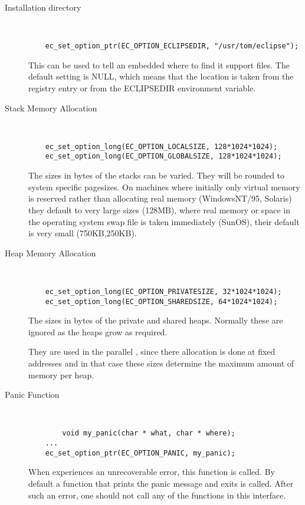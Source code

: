 \begin{description}
\item[Installation directory]\ \\
\begin{verbatim}
	ec_set_option_ptr(EC_OPTION_ECLIPSEDIR, "/usr/tom/eclipse");
\end{verbatim}
This can be used to tell an embedded {\eclipse} where to find it support files.
The default setting is NULL, which means that the location is
taken from the registry entry or from the ECLIPSEDIR environment variable.


\item[Stack Memory Allocation]\ \\
\begin{verbatim}
	ec_set_option_long(EC_OPTION_LOCALSIZE, 128*1024*1024);
	ec_set_option_long(EC_OPTION_GLOBALSIZE, 128*1024*1024);
\end{verbatim}
The sizes in bytes of the stacks can be varied. They will be rounded to
system specific pagesizes. On machines where initially only virtual memory
is reserved rather than allocating real memory (WindowsNT/95, Solaris) they
default to very large sizes (128MB), where real memory or space in the
operating system swap file is taken immediately (SunOS), their default
is very small (750KB,250KB).


\item[Heap Memory Allocation]\ \\
\begin{verbatim}
	ec_set_option_long(EC_OPTION_PRIVATESIZE, 32*1024*1024);
	ec_set_option_long(EC_OPTION_SHAREDSIZE, 64*1024*1024);
\end{verbatim}
The sizes in bytes of the private and shared heaps. Normally these are
ignored as the heaps grow as required.

They are used in the parallel {\eclipse}, since there allocation is done
at fixed addresses and in that case these sizes  determine the maximum
amount of memory per heap.


\item[Panic Function]\ \\
\begin{verbatim}
        void my_panic(char * what, char * where);
	...
	ec_set_option_ptr(EC_OPTION_PANIC, my_panic);
\end{verbatim}
When {\eclipse} experiences an unrecoverable error, this function
is called. By default a function that prints the panic message
and exits is called. After such an error, one should not call any
of the functions in this interface.



\end{description}

